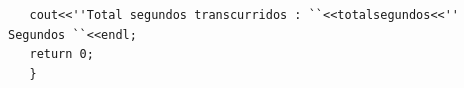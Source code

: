 \documentclass[12pt]{exam}
\begin{document}
\begin{questions}
\begin{lstlisting}
    















    














    
   cout<<''Total segundos transcurridos : ``<<totalsegundos<<'' Segundos ``<<endl;
   return 0;
   }
\end{lstlisting}









\end{questions}
\end{document}

